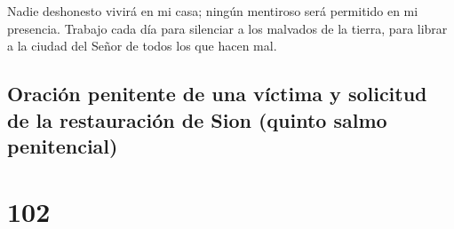  Nadie deshonesto vivirá en mi casa; ningún mentiroso será
permitido en mi presencia.  Trabajo cada día para
silenciar a los malvados de la tierra, para librar a la ciudad del Señor
de todos los que hacen mal.

\hypertarget{oraciuxf3n-penitente-de-una-vuxedctima-y-solicitud-de-la-restauraciuxf3n-de-sion-quinto-salmo-penitencial}{%
\subsection{Oración penitente de una víctima y solicitud de la
restauración de Sion (quinto salmo
penitencial)}\label{oraciuxf3n-penitente-de-una-vuxedctima-y-solicitud-de-la-restauraciuxf3n-de-sion-quinto-salmo-penitencial}}

\hypertarget{section-101}{%
\section{102}\label{section-101}}

